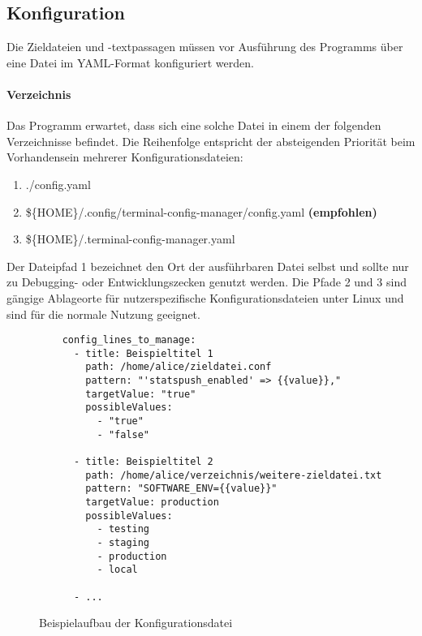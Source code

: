 \subsection{Konfiguration} \label{Konfiguration}
Die Zieldateien und -textpassagen müssen vor Ausführung des Programms
über eine Datei im YAML-Format \cite{yaml} konfiguriert werden.

\paragraph{Verzeichnis}
Das Programm erwartet, dass sich eine solche Datei in einem der folgenden
Verzeichnisse befindet. Die Reihenfolge entspricht der absteigenden Priorität
beim Vorhandensein mehrerer Konfigurationsdateien:

\begin{enumerate}
  \item ./config.yaml
  \item \$\{HOME\}/.config/terminal-config-manager/config.yaml \textbf{(empfohlen)}
  \item \$\{HOME\}/.terminal-config-manager.yaml
\end{enumerate}

Der Dateipfad 1 bezeichnet den Ort der ausführbaren Datei selbst und sollte nur
zu Debugging- oder Entwicklungszecken genutzt werden. Die Pfade 2 und 3 sind
gängige Ablageorte für nutzerspezifische Konfigurationsdateien unter Linux und
sind für die normale Nutzung geeignet.

\newenvironment{code}{\captionsetup{type=listing}}{}

\begin{figure}
  \caption{Beispielaufbau der Konfigurationsdatei}
  \label{fig:sample-config}
  \begin{verbatim}
    config_lines_to_manage:
      - title: Beispieltitel 1
        path: /home/alice/zieldatei.conf
        pattern: "'statspush_enabled' => {{value}},"
        targetValue: "true"
        possibleValues:
          - "true"
          - "false"

      - title: Beispieltitel 2
        path: /home/alice/verzeichnis/weitere-zieldatei.txt
        pattern: "SOFTWARE_ENV={{value}}"
        targetValue: production
        possibleValues:
          - testing
          - staging
          - production
          - local

      - ...
  \end{verbatim}
\end{figure}

